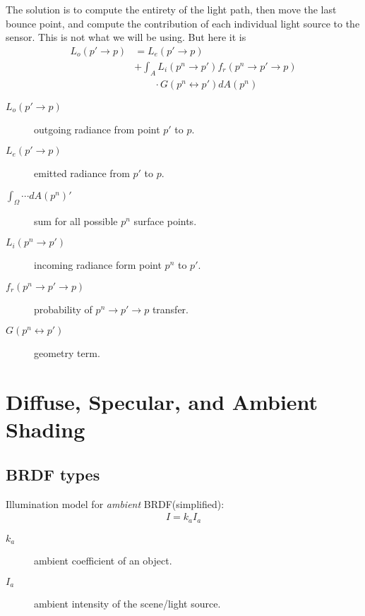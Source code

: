 \documentclass[10pt]{armath}
\numberwithin{equation}{section}
\theoremstyle{definition}
\newcommand{\ra}{\rightarrow}
\newcommand{\lra}{\leftrightarrow}
\begin{document}
\begin{multicols}{2}
  The solution is to compute the entirety of the light path, then move the last
  bounce point, and compute the contribution of each individual light source to
  the sensor. This is not what we will be using. But here it is
  \begin{align*}
    L_o\left(p'\ra p\right)&=L_e\left(p'\ra p\right)\\&+\int_AL_i\left(p^n\ra
      p'\right)f_r\left(p^n\ra p'\ra p\right)\\&\quad\quad\cdot G\left(p^n\lra
      p'\right)dA\left(p^n\right)
  \end{align*}
  \begin{description}
    \item[$L_o\left(p'\ra p\right)$] outgoing radiance from point $p'$ to $p$.
    \item[$L_e\left(p'\ra p\right)$] emitted radiance from $p'$ to $p$.
    \item[$\int_\Omega\cdots dA\left(p^n\right)'$] sum for all possible $p^n$
      surface points.
    \item[$L_i\left(p^n\ra p'\right)$] incoming radiance form point $p^n$ to
      $p'$.
    \item[$f_r\left(p^n\ra p'\ra p\right)$] probability of $p^n\ra p'\ra p$
      transfer.
    \item[$G\left(p^n\lra p'\right)$] geometry term.
  \end{description}

  \section{Diffuse, Specular, and Ambient Shading}%
  \label{sec:diffuse_specular_and_ambient_shading}

  \subsection{BRDF types}%
  \label{sub:brdf_types}

  Illumination model for \textit{ambient} BRDF(simplified):
  \begin{align*}
    I=k_aI_a
  \end{align*}
  \begin{description}
    \item[$k_a$] ambient coefficient of an object.
    \item[$I_a$] ambient intensity of the scene/light source.
  \end{description}


\end{multicols}
\end{document}
